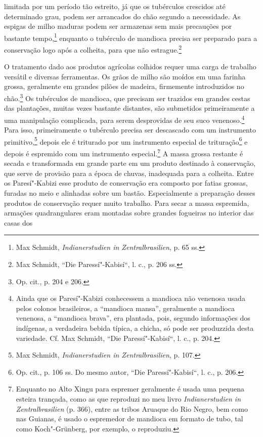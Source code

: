 limitada por um período tão estreito, já que os tubérculos crescidos até
determinado grau, podem ser arrancados do chão segundo a necessidade. As
espigas de milho maduras podem ser armazenas sem mais precauções por
bastante tempo,\footnote{Max Schmidt, \emph{Indianerstudien in
  Zentralbrasilien}, p. 65 ss.} enquanto o tubérculo de mandioca
precisa ser preparado para a conservação logo após a colheita, para que
não estrague.\footnote{Max Schmidt, ``Die Paressí"-Kabisí``, l. c., p. 206
  ss.}

O tratamento dado aos produtos agrícolas colhidos requer uma carga de
trabalho versátil e diversas ferramentas. Os grãos de milho são moídos
em uma farinha grossa, geralmente em grandes pilões de madeira,
firmemente introduzidos no chão.\footnote{Op. cit., p. 204 e 206.} Os
tubérculos de mandioca, que precisam ser trazidos em grandes cestas das
plantações, muitas vezes bastante distantes, são submetidos
primeiramente a uma manipulação complicada, para serem desprovidas de
seu suco venenoso.\footnote{Ainda que os Paresí"-Kabizi conhecessem a
  mandioca não venenosa usada pelos colonos brasileiros, a ``mandioca
  mansa'', geralmente a mandioca venenosa, a ``mandioca brava'', era
  plantada, pois, segundo informações dos indígenas, a verdadeira bebida
  típica, a chicha, só pode ser produzzida desta variedade. Cf. Max
  Schmidt, ``Die Paressí"-Kabisí``, l. c., p. 204.} Para isso,
primeiramente o tubérculo precisa ser descascado com um instrumento
primitivo,\footnote{Max Schmidt, \emph{Indianerstudien in
  Zentralbrasilien}, p. 107.} depois ele é triturado por um instrumento
especial de trituração\footnote{Op. cit., p. 106 ss. Do mesmo autor,
  ``Die Paressí"-Kabisí``, l. c., p. 206.} e depois é espremido com um
instrumento especial.\footnote{Enquanto no Alto Xingu para espremer
  geralmente é usada uma pequena esteira trançada, como as que reproduzi
  no meu livro \emph{Indianerstudien in Zentralbrasilien} (p. 366),
  entre as tribos Aruaque do Rio Negro, bem como nas Guianas, é usado o
  espremedor de mandioca em formato de tubo, tal como Koch"-Grünberg, por
  exemplo, o reproduziu.} A massa grossa restante é secada e
transformada em grande parte em um produto destinado à conservação,
que serve de provisão para a época de chuvas, inadequada para a
colheita. Entre os Paresí"-Kabizi esse produto de conservação era
composto por fatias grossas, furadas no meio e alinhadas sobre um
bastão. Especialmente a preparação desses produtos de conservação requer
muito trabalho. Para secar a massa espremida, armações quadrangulares
eram montadas sobre grandes fogueiras no interior das casas dos

